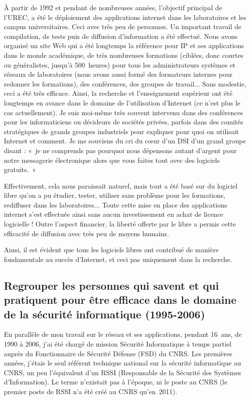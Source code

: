 \documentclass{FramateX}
\begin{document}
\begin{refsection}
À partir de 1992 et pendant de nombreuses années, l'objectif principal
de l'UREC, a été le déploiement des applications internet dans les
laboratoires et les campus universitaires. Ceci avec très peu de
personnes. Un important travail de compilation, de tests puis de
diffusion d'information a été effectué. Nous avons organisé un site Web
qui a été longtemps la référence pour IP et ses applications dans le
monde académique, de très nombreuses formations (ciblées, donc courtes
ou généralistes, jusqu'à 500~heures) pour tous les administrateurs
systèmes et réseaux de laboratoires (nous avons aussi formé des
formateurs internes pour redonner les formations), des conférences, des
groupes de travail... Sans modestie, ceci a été très efficace. Ainsi,
la recherche et l'enseignement supérieur ont été longtemps en avance
dans le domaine de l'utilisation d'Internet (ce n'est plus le cas
actuellement). Je suis moi-même très souvent intervenu dans des
conférences pour les informaticiens ou décideurs de sociétés privées,
parfois dans des comités stratégiques de grands groupes industriels
pour expliquer pour quoi on utilisait Internet et comment. Je me
souviens du cri du cœur d'un DSI d'un grand groupe disant : «~je ne
comprends pas pourquoi nous dépensons autant d'argent pour notre
messagerie électronique alors que vous faites tout avec des logiciels
gratuits.~»

Effectivement, cela nous paraissait naturel, mais tout a été basé sur du
logiciel libre qu'on a pu étudier, tester, utiliser sans problème pour
les formations, rediffuser dans les laboratoires... Toute cette mise en
place des applications internet s'est effectuée ainsi sans aucun
investissement en achat de licence logicielle ! Outre l'aspect
financier, la liberté offerte par le libre a permis cette efficacité de
diffusion avec très peu de moyens humains.

Ainsi, il est évident que tous les logiciels libres ont contribué de
manière fondamentale au succès d'Internet, et ceci pas uniquement dans
la recherche.


\subsection*{Regrouper les personnes qui savent et qui pratiquent pour être efficace
dans le domaine de la sécurité informatique (1995-2006)}

En parallèle de mon travail sur le réseau et ses applications, pendant
16~ans, de 1990 à 2006, j'ai été chargé de mission Sécurité
Informatique à temps partiel auprès du Fonctionnaire de Sécurité
Défense (FSD) du CNRS. Les premières années, j'étais le seul référent
technique national sur la sécurité informatique au CNRS, un peu
l'équivalent d'un RSSI (Responsable de la Sécurité des Systèmes
d'Information). Le terme n'existait pas à l'époque, ni le poste au CNRS
(le premier poste de RSSI n'a été créé au CNRS qu'en~2011).


\end{refsection}
\end{document}
